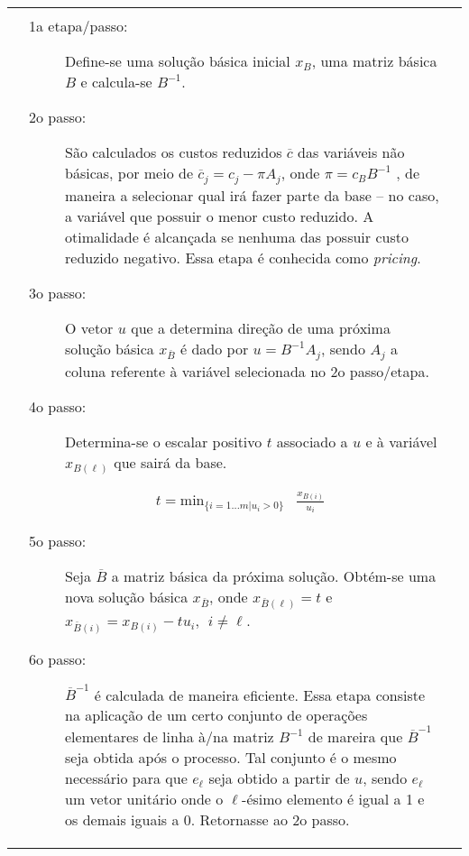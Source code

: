         \begin{table}[htpb!]
        \centering
        \begin{tabular}{|p{}p{}p{}|}
        \hline
         &         &  \\
         & \begin{description}
            \item[1a etapa/passo:] Define-se uma solução básica inicial $x_B$, uma matriz básica $B$ e calcula-se $B^{-1}$.
            
            \item[2o passo:] São calculados os custos reduzidos $\overline{c}$ das variáveis não básicas, por meio de $ \overline{c}_j = c_j - \pi A_j $, onde $ \pi = c_B B^{-1}$ , de maneira a selecionar qual irá fazer parte da base -- no caso, a variável que possuir o menor custo reduzido. A otimalidade é alcançada se nenhuma das possuir custo reduzido negativo. Essa etapa é conhecida como \textit{pricing}.
            
            \item[3o passo:] O vetor $ u $ que a determina direção de uma próxima solução básica $x_{\overline{B}}$ é dado por $ u = B^{-1} A_j $, sendo $A_j$ a coluna referente à variável selecionada no 2o passo/etapa.
            
            \item[4o passo:] Determina-se o escalar positivo $ t $ associado a $ u $ e à variável $x_{B(\ell)}$ que sairá da base.
            \end{description}
            
                $$\begin{aligned}
                    && t = \text{min}_{\{i = 1...m | u_i > 0\}}& \frac{x_{B(i)}}{u_i} &
                \end{aligned}$$
                
            \begin{description}
            \item[5o passo:] Seja $\overline{B} $ a matriz básica da próxima solução. Obtém-se uma nova solução básica $ x_{\overline{B}}$, onde $ x_{\overline{B}(\ell)} = t $ e $        x_{\overline{B}(i)} = x_{B(i)} - t u_i, \ \ i \neq \ell $.
            
            \item[6o passo:] $\overline{B}^{-1} $ é calculada de maneira eficiente. Essa etapa consiste na aplicação de um certo conjunto de operações elementares de linha à/na matriz $ B^{-1} $ de mareira que $\overline{B}^{-1} $ seja obtida após o processo. Tal conjunto é o mesmo necessário para que $ e_{\ell} $ seja obtido a partir de $ u $, sendo $ e_{\ell} $ um vetor unitário onde o $\ell$-ésimo elemento é igual a 1 e os demais iguais a 0. Retornasse ao 2o passo.
            

\end{description}
\end{tabular}
\end{table}
